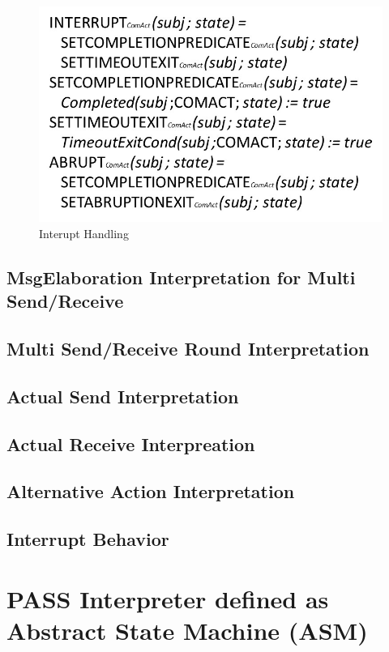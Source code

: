 \begin{figure}[ph]
	\centering
	\includegraphics[width=0.6\linewidth]{20181026-Ontologie-Bilder/Grafiken-Ontologie/SUbjectExecution/ASM-Interrupt}
	\caption[Interupt Handling]{Interupt Handling}
	\label{fig:asm-interrupt}
\end{figure}

\newpage


\section{MsgElaboration Interpretation for Multi Send/Receive}



\section{Multi Send/Receive Round Interpretation}

\section{Actual Send Interpretation}

\section{Actual Receive Interpreation}


\section{Alternative Action Interpretation}


\section{Interrupt Behavior}


\chapter{PASS Interpreter defined as Abstract State Machine (ASM)}

